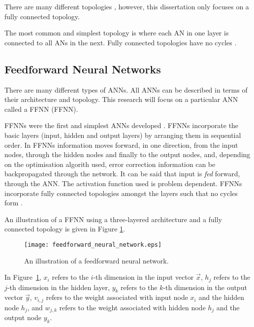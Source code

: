 There are many different topologies \cite{ref:miikkulainen:2010}, however, this
dissertation only focuses on a fully connected
topology.

The most common and simplest topology is where each \ac{AN} in one layer is
connected to all \acp{AN} in the next. Fully connected topologies have no
cycles \cite{ref:zell:1994}.


\subsection{Feedforward Neural Networks}
\label{sec:anns:anns:ffnns}

There are many different types of \acp{ANN}. All \acp{ANN} can be described
in terms of their architecture and topology. This research will focus on a
particular \ac{ANN} called a \acl{FFNN} (\acs{FFNN}).

\acp{FFNN} were the first and simplest \acp{ANN} developed
\cite{ref:schmidhuber:2015}. \acp{FFNN} incorporate the basic layers (input,
hidden and output layers) by arranging them in sequential order. In \acp{FFNN}
information moves forward, in one direction, from the input nodes, through the
hidden nodes and finally to the output nodes, and, depending on the optimisation
algorith used, error correction information can be backpropagated through the
network. It can be said that input is \textit{fed} forward, through the
\ac{ANN}. The activation function used is problem
dependent. \acp{FFNN} incorporate fully connected topologies amongst the layers
such that no cycles form \cite{ref:zell:1994}.

An illustration of a \ac{FFNN} using a three-layered architecture and a fully
connected topology is given in Figure \ref{fig:ffnn}.

\begin{figure}[htpb]
    \centering
    \texttt{[image: feedforward\_neural\_network.eps]}
    \caption[A Feedforward neural network]{An
    illustration of a feedforward neural network.}
    \label{fig:ffnn}
\end{figure}

In Figure~\ref{fig:ffnn}, $x_i$ refers to the $i$-th dimension in the input
vector $\vec{x}$, $h_j$ refers to the $j$-th dimension in the hidden layer,
$y_k$ refers to the $k$-th dimension in the output vector $\vec{y}$, $v_{i,j}$
refers to the weight associated with input node $x_i$ and the hidden node $h_j$, and $w_{j,k}$ refers to the weight associated with hidden node $h_j$ and the
output node $y_k$.

